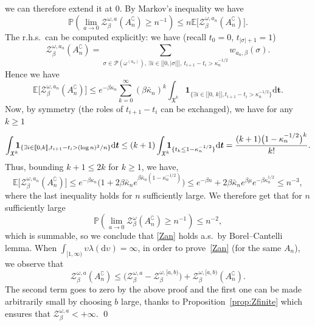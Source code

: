 \documentclass[10pt]{amsart}
\let\mathcal\mathscr
\newcommand{\lint}{\mathopen{[\![}}
\newcommand{\rint}{\mathclose{]\!]}}
\theoremstyle{definition}
\newcommand{\bt}{\boldsymbol{t}}
\newcommand{\dd}{\mathrm{d}}
\newcommand{\ind}{\mathbf{1}}
\let\cc\complement
\newcommand{\cP}{{\ensuremath{\mathcal P}} }
\newcommand{\cZ}{{\ensuremath{\mathcal Z}} }
\newcommand{\bbE}{{\ensuremath{\mathbb E}} }
\newcommand{\bbP}{{\ensuremath{\mathbb P}} }
\let\gb\beta
\let\gl\lambda
\let\ups\upsilon
\let\go\omega
\begin{document}
we can therefore extend it at $0$.
By Markov's inequality we have
\begin{equation}
\bbP\left(\lim_{a\to 0}\cZ^{\go, a}_{\beta}(A^{\cc}_{n})\ge n^{-1} \right) \le n \bbE \bigl[ \cZ^{\go,a_n}_{\beta}(A^{\cc}_{n}) \bigr].
\end{equation}
The r.h.s.\ can be computed explicitly: we have (recall $t_0=0$, $t_{|\sigma|+1}=1$)
\begin{equation*}
\cZ^{\go,a_n}_{\beta}(A^{\cc}_{n})= \sum_{\sigma \in \cP(\go^{(a_n)}),\, \exists i\in \lint 0, |\sigma|\rint, \ t_{i+1}-t_{i}> \kappa_n^{-1/2} } w_{a_n,\beta}(\sigma).
\end{equation*}
Hence we have
\begin{equation*}
\bbE \bigl[\cZ^{\go,a_n}_{\beta}(A^{\cc}_{n})\bigr]
\le e^{-\beta \kappa_{n}}\sum_{k=0}^{\infty} (\beta \bar \kappa_n)^k \int_{ \mathfrak{X}^k} \ind_{\{ \exists i\in \lint 0,\, k\rint, t_{i+1}-t_{i}> \kappa_n^{-1/2} \}} \dd \bt.
\end{equation*}
Now, by symmetry (the roles of $t_{i+1}-t_i$ can be exchanged), we have for any $k\ge 1$
\begin{equation*}
\int_{ \mathfrak{X}^k} \hspace*{-2mm}\ind_{\{ \exists i\in \lint 0, k\rint, t_{i+1}-t_{i}> (\log n)^2/n \}} \dd \bt \le (k+1) \int_{ \mathfrak{X}^k} \hspace*{-2mm}\ind_{\{ t_k\le 1- \kappa_n^{-1/2} \}} \dd \bt = \frac{ (k+1) \bigl(1- \kappa_n^{-1/2} \bigr)^k}{k!}.
\end{equation*}
Thus, bounding $k+1\leq 2 k$ for $k\geq 1$, we have,
\[
\bbE \bigl[\cZ^{\go,a_n}_{\beta}(A^{\cc}_{n})\bigr]
\le
e^{-\beta \kappa_{n}} \bigl(1+ 2\beta \bar \kappa_n e^{\gb \bar \kappa_n (1- \kappa_n^{-1/2}) } \bigr)
\le e^{-\beta n}+ 2\beta \bar \kappa_n e^{\beta \mu} e^{ -\gb \kappa_n^{1/2} }
\le n^{-3},
\]
where the last inequality holds for $n$ sufficiently large.
We therefore get that for $n$ sufficiently large\vspace*{-3pt}
\begin{equation}
\bbP\left(\lim_{a\to 0}\cZ^{\go}_{\beta}(A^{\cc}_{n})\ge n^{-1} \right) \le n^{-2},
\end{equation}
which is summable, so we conclude that \eqref{Zan} holds a.s.\ by Borel--Cantelli lemma.
When $\int_{[1,\infty)}\ups \gl (\dd \ups) =\infty$, in order to prove~\eqref{Zan} (for the same $A_n$),
we observe that\vspace*{-3pt}
\begin{equation}
\cZ^{\go,a}_{\beta}(A^{\cc}_{n})\le \bigl(\cZ^{\go,a}_{\beta}- \cZ^{\go,[a,b)}_{\beta} \bigr) + \cZ^{\go,[a,b)}_{\beta}(A^{\cc}_{n}).
\end{equation}
The second term goes to zero by the above proof and the first one can be made arbitrarily small by choosing $b$ large, thanks to Proposition~\ref{prop:Zfinite} which ensures that $\cZ_{\gb}^{\go,a}<+\infty$.
\qed
\end{document}
